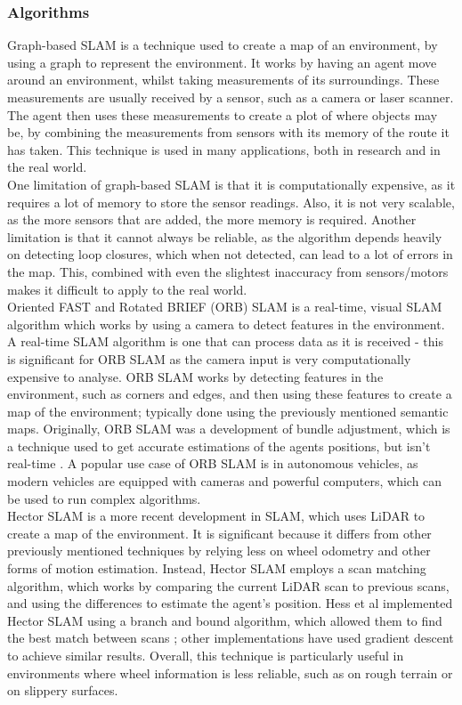 \documentclass[12pt]{article}
\begin{document}
\subsubsection{Algorithms}
Graph-based SLAM is a technique used to create a map of an environment, by using a graph to represent the environment. It
works by having an agent move around an environment, whilst taking measurements of its surroundings. These measurements
are usually received by a sensor, such as a camera or laser scanner. The agent then uses these measurements to create a
plot of where objects may be, by combining the measurements from sensors with its memory of the route it has taken. This
technique is used in many applications, both in research and in the real world.\\
One limitation of graph-based SLAM is that it is computationally expensive, as it requires a lot of memory to store the
sensor readings. Also, it is not very scalable, as the more sensors that are added, the more memory is required. Another
limitation is that it cannot always be reliable, as the algorithm depends heavily on detecting loop closures, which when
not detected, can lead to a lot of errors in the map. This, combined with even the slightest inaccuracy from sensors/motors
makes it difficult to apply to the real world.\\
Oriented FAST and Rotated BRIEF (ORB) SLAM is a real-time, visual SLAM algorithm which works by using a camera to detect features
in the environment. A real-time SLAM algorithm is one that can process data as it is received - this is significant for ORB SLAM
as the camera input is very computationally expensive to analyse. ORB SLAM works by detecting features in the environment, such
as corners and edges, and then using these features to create a map of the environment; typically done using the previously
mentioned semantic maps. Originally, ORB SLAM was a development of bundle adjustment, which is a technique used to get accurate
estimations of the agents positions, but isn't real-time \cite{ORB_SLAM}. A popular use case of ORB SLAM is in autonomous vehicles,
as modern vehicles are equipped with cameras and powerful computers, which can be used to run complex algorithms.\\
Hector SLAM is a more recent development in SLAM, which uses LiDAR to create a map of the environment. It is significant because it
differs from other previously mentioned techniques by relying less on wheel odometry and other forms of motion estimation. Instead,
Hector SLAM employs a scan matching algorithm, which works by comparing the current LiDAR scan to previous scans, and using the
differences to estimate the agent's position. Hess et al implemented Hector SLAM using a branch and bound algorithm, which allowed
them to find the best match between scans \cite{Hector_SLAM}; other implementations have used gradient descent to achieve similar
results. Overall, this technique is particularly useful in environments where wheel information is less reliable, such as on rough terrain
or on slippery surfaces. \\
\end{document}
